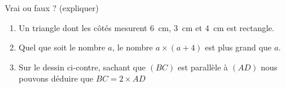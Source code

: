 
\begin{exercice}\label{exo2smath-0154}

    \begin{multicols}{2}
    Vrai ou faux ? (expliquer)
    \begin{enumerate}
        \item
            Un triangle dont les côtés mesurent \SI{6}{\centi\meter}, \SI{3}{\centi\meter} et \SI{4}{\centi\meter} est rectangle.
        \item
            Quel que soit le nombre \( a\), le nombre \( a\times (a+4)\) est plus grand que \( a\).
        \item   \label{ItemITNOooXrgyJt}
            Sur le dessin ci-contre, sachant que \( (BC)\) est parallèle à \( (AD)\) nous pouvons déduire que \( BC=2\times AD\) 

    \end{enumerate}
    \columnbreak
            \begin{center}
                
            \end{center}
    \end{multicols}

\end{exercice}
